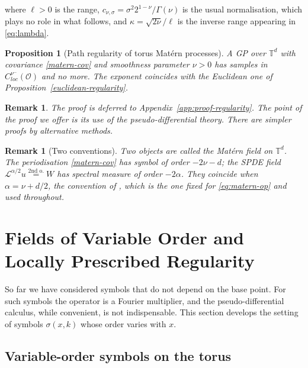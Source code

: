 \documentclass[pdflatex,sn-mathphys,Numbered]{sn-jnl}
\theoremstyle{thmstyleone}%
\newtheorem{proposition}[theorem]{Proposition}%
\theoremstyle{thmstyletwo}%
\newtheorem{remark}[theorem]{Remark}%
\theoremstyle{thmstylethree}%
\newcommand{\TT}{\mathbb{T}}
\newcommand{\calL}{\mathcal{L}}
\newcommand{\calO}{\mathcal{O}}
\newcommand{\eqso}{\stackrel{\text{2nd o.}}{=}}
\begin{document}
where $\ell>0$ is the range, $c_{\nu,\sigma} = \sigma^2 2^{1-\nu}/\Gamma(\nu)$
is the usual normalisation, which plays no role in what follows, and
$\kappa = \sqrt{2\nu}/\ell$ is the inverse range appearing in \eqref{eq:lambda}.

\begin{proposition}[Path regularity of torus Mat\'ern processes]
    \label{proposition:regularity}
    A GP over $\TT^d$ with covariance \eqref{matern-cov} and smoothness parameter
    $\nu > 0$ has samples in $C^{\nu^-}_{loc}(\calO)$ and no more. The exponent
    coincides with the Euclidean one of Proposition~\ref{euclidean-regularity}.
\end{proposition}

\begin{remark}\label{rem:proof-pdo}
The proof is deferred to Appendix~\ref{app:proof-regularity}. The point of
the proof we offer is its use of the pseudo-differential theory. There are simpler proofs by alternative methods.
\end{remark}


\begin{remark}[Two conventions]\label{rem:convention}
Two objects are called the Mat\'ern field on $\TT^d$. The periodisation
\eqref{matern-cov} has symbol of order $-2\nu-d$; the SPDE field
$\calL^{\alpha/2}u \eqso W$ has spectral measure of order $-2\alpha$. They
coincide when $\alpha = \nu + d/2$, the convention of \cite{lindgren2011}, which
is the one fixed for \eqref{eq:matern-op} and used throughout.
\end{remark}

\section{Fields of Variable Order and Locally Prescribed Regularity}
\label{sec:variable-order}

So far we have considered symbols that do not depend on the base point. For
such symbols the operator is a Fourier multiplier, and the pseudo-differential
calculus, while convenient, is not indispensable. This section develops the
setting of symbols $\sigma(x,k)$ whose order varies with $x$.

\subsection{Variable-order symbols on the torus}
\end{document}
